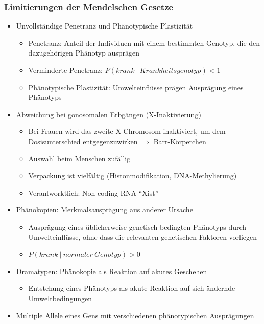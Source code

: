 \subsubsection{Limitierungen der Mendelschen Gesetze}
\begin{itemize}
    \item Unvollständige Penetranz und Phänotypische Plastizität
        \begin{itemize}
            \item Penetranz: Anteil der Individuen mit einem bestimmten Genotyp, die den dazugehörigen Phänotyp ausprägen
            \item Verminderte Penetranz: $P(krank~|~Krankheitsgenotyp) < 1$
            \item Phänotypische Plastizität: Umwelteinflüsse prägen Ausprägung eines Phänotyps
        \end{itemize}
    \item Abweichung bei gonosomalen Erbgängen (X-Inaktivierung)
        \begin{itemize}
            \item Bei Frauen wird das zweite X-Chromosom inaktiviert, um dem Dosisunterschied entgegenzuwirken $\Rightarrow$ Barr-Körperchen
            \item Auswahl beim Menschen zufällig
            \item Verpackung ist vielfältig (Histonmodifikation, DNA-Methylierung)
            \item Verantworktlich: Non-coding-RNA ``Xist''
        \end{itemize}
    \item Phänokopien: Merkmalsausprägung aus anderer Ursache
        \begin{itemize}
            \item Ausprägung eines üblicherweise genetisch bedingten Phänotyps durch Umwelteinflüsse, ohne dass die relevanten genetischen Faktoren vorliegen
            \item $ P(krank~|~normaler ~ Genotyp) > 0 $
        \end{itemize}
    \item Dramatypen: Phänokopie als Reaktion auf akutes Geschehen
        \begin{itemize}
            \item Entstehung eines Phänotyps als akute Reaktion auf sich ändernde Umweltbedingungen
        \end{itemize}
    \item Multiple Allele eines Gens mit verschiedenen phänotypischen Ausprägungen

\end{itemize}
